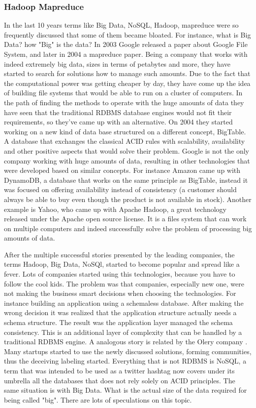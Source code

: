 \subsubsection{Hadoop Mapreduce}
In the last 10 years terms like Big Data, NoSQL, Hadoop, mapreduce were so frequently discussed that some of them became bloated. For instance, what is Big Data? how "Big" is the data? In 2003 Google released a paper about Google File System, and later in 2004 a mapreduce paper. Being a company that works with indeed extremely big data, sizes in terms of petabytes and more, they have started to search for solutions how to manage such amounts. Due to the fact that the computational power was getting cheaper by day, they have come up the idea of building file systems that would be able to run on a cluster of computers. In the path of finding the methods to operate with the huge amounts of data they have seen that the traditional RDBMS database engines would not fit their requirements, so they've came up with an alternative. On 2004 they started working on a new kind of data base structured on a different concept, BigTable. A database that exchanges the classical ACID rules with scalability, availability and other positive aspects that would solve their problem. Google is not the only company working with huge amounts of data, resulting in other technologies that were developed based on similar concepts. For instance Amazon came up with DynamoDB, a database that works on the same principle as BigTable, instead it was focused on offering availability instead of consistency (a customer should always be able to buy even though the product is not available in stock). Another example is Yahoo, who came up with Apache Hadoop, a great technology released under the Apache open source license. It is a files system that can work on multiple computers and indeed successfully solve the problem of processing big amounts of data.

After the multiple successful stories presented by the leading companies, the terms Hadoop, Big Data, NoSQl, started to become popular and spread like a fever. Lots of companies started using this technologies, because you have to follow the cool kids. The problem was that companies, especially new one, were not making the business smart decisions when choosing the technologies. For instance building an application using a schemaless database. After making the wrong decision it was realized that the application structure actually needs a schema structure. The result was the application layer managed the schema consistency. This is an additional layer of complexity that can be handled by a traditional RDBMS engine. A analogous story is related by the Olery company \cite{mongo_to_postgres}. Many startups started to use the newly discussed solutions, forming communities, thus the deceiving labeling started. Everything that is not RDBMS is NoSQL, a term that was intended to be used as a twitter hashtag now covers under its umbrella all the databases that does not rely solely on ACID principles. The same situation is with Big Data. What is the actual size of the data required for being called "big". There are lots of speculations on this topic.

